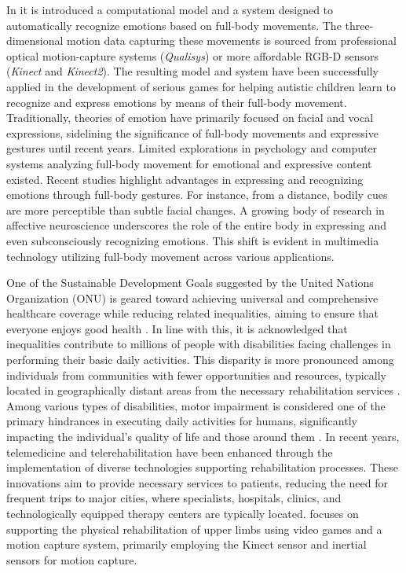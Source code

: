 In \cite{emotion_recognition} it is introduced a computational model and a system designed to automatically recognize emotions based on full-body movements.
The three-dimensional motion data capturing these movements is sourced from professional optical motion-capture systems (\textit{Qualisys}) or more affordable RGB-D sensors (\textit{Kinect} and \textit{Kinect2}).
The resulting model and system have been successfully applied in the development of serious games for helping autistic children learn to recognize and express emotions by means of their full-body movement.
Traditionally, theories of emotion have primarily focused on facial and vocal expressions, sidelining the significance of full-body movements and expressive gestures until recent years.
Limited explorations in psychology and computer systems analyzing full-body movement for emotional and expressive content existed.
Recent studies highlight advantages in expressing and recognizing emotions through full-body gestures.
For instance, from a distance, bodily cues are more perceptible than subtle facial changes.
A growing body of research in affective neuroscience underscores the role of the entire body in expressing and even subconsciously recognizing emotions.
This shift is evident in multimedia technology utilizing full-body movement across various applications.

One of the Sustainable Development Goals suggested by the United Nations Organization (ONU) is geared toward achieving universal and comprehensive healthcare coverage while reducing related inequalities, aiming to ensure that everyone enjoys good health \cite{onu}.
In line with this, it is acknowledged that inequalities contribute to millions of people with disabilities facing challenges in performing their basic daily activities.
This disparity is more pronounced among individuals from communities with fewer opportunities and resources, typically located in geographically distant areas from the necessary rehabilitation services \cite{world_report_disability}.
Among various types of disabilities, motor impairment is considered one of the primary hindrances in executing daily activities for humans, significantly impacting the individual's quality of life and those around them \cite{ida_website}.
In recent years, telemedicine and telerehabilitation have been enhanced through the implementation of diverse technologies supporting rehabilitation processes.
These innovations aim to provide necessary services to patients, reducing the need for frequent trips to major cities, where specialists, hospitals, clinics, and technologically equipped therapy centers are typically located.
\cite{riabilitazione} focuses on supporting the physical rehabilitation of upper limbs using video games and a motion capture system, primarily employing the Kinect sensor and inertial sensors for motion capture.

